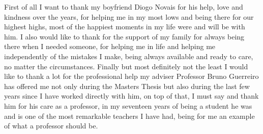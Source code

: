 
%

\begin{ntacknowledgements}

First of all I want to thank my boyfriend Diogo Novais for his help, love and kindness over the years, for helping me in my most lows and being there for our highest highs, most of the happiest moments in my life were and will be with him. I also would like to thank for the support of my family for always being there when I needed someone, for helping me in life and helping me independently of the mistakes I make, being always available and ready to care, no matter the circumstances. Finally but most definitely not the least I would like to thank a lot for the professional help my adviser Professor Bruno Guerreiro has offered me not only during the Masters Thesis but also during the last few years since I have worked directly with him, on top of that, I must say and thank him for his care as a professor, in my seventeen years of being a student he was and is one of the most remarkable teachers I have had, being for me an example of what a professor should be.
\end{ntacknowledgements}
